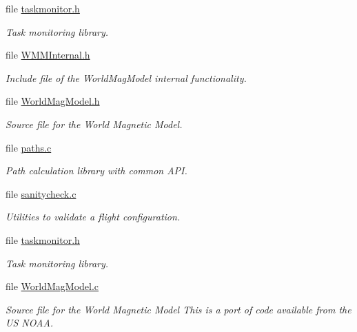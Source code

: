 \begin{DoxyCompactItemize}
file \hyperlink{taskmonitor_8h}{taskmonitor.\-h}
\begin{DoxyCompactList}\small\item\em \-Task monitoring library. \end{DoxyCompactList}\item 
file \hyperlink{_w_m_m_internal_8h}{\-W\-M\-M\-Internal.\-h}
\begin{DoxyCompactList}\small\item\em \-Include file of the \-World\-Mag\-Model internal functionality. \end{DoxyCompactList}\item 
file \hyperlink{_world_mag_model_8h}{\-World\-Mag\-Model.\-h}
\begin{DoxyCompactList}\small\item\em \-Source file for the \-World \-Magnetic \-Model. \end{DoxyCompactList}\item 
file \hyperlink{paths_8c}{paths.\-c}
\begin{DoxyCompactList}\small\item\em \-Path calculation library with common \-A\-P\-I. \end{DoxyCompactList}\item 
file \hyperlink{sanitycheck_8c}{sanitycheck.\-c}
\begin{DoxyCompactList}\small\item\em \-Utilities to validate a flight configuration. \end{DoxyCompactList}\item 
file \hyperlink{taskmonitor_8h}{taskmonitor.\-h}
\begin{DoxyCompactList}\small\item\em \-Task monitoring library. \end{DoxyCompactList}\item 
file \hyperlink{_world_mag_model_8c}{\-World\-Mag\-Model.\-c}
\begin{DoxyCompactList}\small\item\em \-Source file for the \-World \-Magnetic \-Model \-This is a port of code available from the \-U\-S \-N\-O\-A\-A. \end{DoxyCompactList}\end{DoxyCompactItemize}
